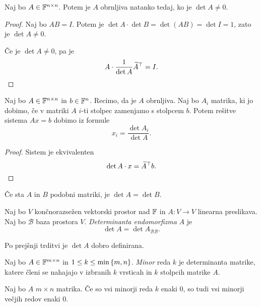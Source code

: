 \documentclass[12pt, a4paper]{article}
\begin{document}
\begin{izrek}
Naj bo $A\in\mathbb{F}^{n\times n}$. Potem je $A$ obrnljiva natanko tedaj, ko je $\det A\ne 0$.
\end{izrek}

\begin{proof}
Naj bo $AB=I$. Potem je $\det A\cdot\det B=\det (AB)=\det I=1$, zato je $\det A\ne 0$.

Če je $\det A\ne 0$, pa je
\[
A\cdot\frac{1}{\det A}\widetilde{A}^\top=I.\qedhere
\]
\end{proof}

\begin{izrek}
Naj bo $A\in\mathbb{F}^{n\times n}$ in $b\in\mathbb{F}^n$. Recimo, da je $A$ obrnljiva. Naj bo $A_i$ matrika, ki jo dobimo, če v matriki $A$ $i$-ti stolpec zamenjamo s stolpcem $b$. Potem rešitve sistema $Ax=b$ dobimo iz formule
\[
x_i=\frac{\det A_i}{\det A}.
\]
\end{izrek}

\begin{proof}
Sistem je ekvivalenten
\[
\det A\cdot x=\widetilde{A}^\top b.\qedhere
\]
\end{proof}

\begin{trditev}
Če sta $A$ in $B$ podobni matriki, je $\det A=\det B$.
\end{trditev}

\obvs

\begin{definicija}
Naj bo $V$ končnorazsežen vektorski prostor nad $\mathbb{F}$ in $A\colon V\to V$ linearna preslikava. Naj bo $\mathcal{B}$ baza prostora $V$. \emph{Determinanta endomorfizma} $A$ je
\[
\det A=\det A_{\mathcal{BB}}.
\]
\end{definicija}

\begin{opomba}
Po prejšnji trditvi je $\det A$ dobro definirana.
\end{opomba}

\begin{definicija}
Naj bo $A\in\mathbb{F}^{m\times n}$ in $1\leq k\leq \min\left\{m,n\right\}$. \emph{Minor} reda $k$ je determinanta matrike, katere členi se nahajajo v izbranih $k$ vrsticah in $k$ stolpcih matrike $A$.
\end{definicija}

\begin{lema}
Naj bo $A$ $m\times n$ matrika. Če so vsi minorji reda $k$ enaki $0$, so tudi vsi minorji večjih redov enaki $0$.
\end{lema}
\end{document}
